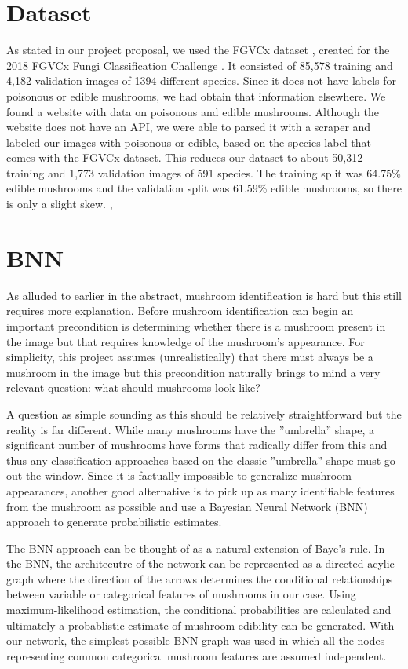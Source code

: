 \documentclass[journal]{IEEEtran}
\begin{document}
\section{Dataset}
As stated in our project proposal, we used the FGVCx dataset \cite{fungi-challenge-fgvc-2018}, created for the 2018 FGVCx Fungi Classification Challenge \cite{Visipedia}. It consisted of 85,578 training and 4,182 validation images of 1394 different species. Since it does not have labels for poisonous or edible mushrooms, we had obtain that information elsewhere. We found a website with data on poisonous and edible mushrooms. Although the website does not have an API, we were able to parsed it with a scraper and labeled our images with poisonous or edible, based on the species label that comes with the FGVCx dataset. This reduces our dataset to about 50,312 training and 1,773 validation images of 591 species. The training split was 64.75\% edible mushrooms and the validation split was 61.59\% edible mushrooms, so there is only a slight skew.
,


\section{BNN}
As alluded to earlier in the abstract, mushroom identification is hard but this still requires more explanation. Before mushroom identification can begin an important precondition is determining whether there is a mushroom present in the image but that requires knowledge of the mushroom’s appearance. For simplicity, this project assumes (unrealistically) that there must always be a mushroom in the image but this precondition naturally brings to mind a very relevant question: what should mushrooms look like?


A question as simple sounding as this should be relatively straightforward but the reality is far different. While many mushrooms have the ''umbrella'' shape, a significant number of mushrooms have forms that radically differ from this and thus any classification approaches based on the classic ''umbrella'' shape must go out the window. Since it is factually impossible to generalize mushroom appearances, another good alternative is to pick up as many identifiable features from the mushroom as possible and use a Bayesian Neural Network (BNN) approach to generate probabilistic estimates.

The BNN approach can be thought of as a natural extension of Baye's rule. In the BNN, the architecutre of the network can be represented as a directed acylic graph where the direction of the arrows determines the conditional relationships between variable or categorical features of mushrooms in our case. Using maximum-likelihood estimation, the conditional probabilities are calculated and ultimately a probablistic estimate of mushroom edibility can be generated. With our network, the simplest possible BNN graph was used in which all the nodes representing common categorical mushroom features are assumed independent.    
\end{document}
